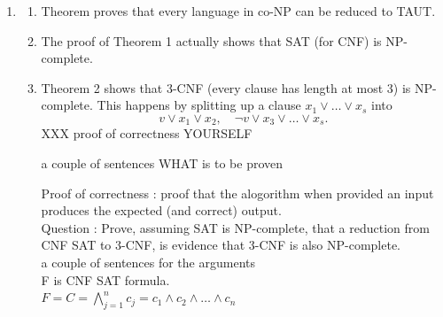 \documentclass[a4paper]{report}
\begin{document}
\begin{enumerate}
\item \cite{Cook1971NP}
  \begin{enumerate}
  \item Theorem proves that every language in co-NP can be reduced to TAUT.
  \item The proof of Theorem 1 actually shows that SAT (for CNF) is NP-complete.
  \item Theorem 2 shows that 3-CNF (every clause has length at most 3) is NP-complete. This happens by splitting up a clause $x_1 \vee \dots \vee x_s$ into
    \begin{displaymath}
      v \vee x_1 \vee x_2, \quad \neg v \vee x_3 \vee \dots \vee x_s.
    \end{displaymath}
XXX proof of correctness YOURSELF

a couple of sentences WHAT is to be proven

Proof of correctness : proof that the alogorithm when provided an input produces the expected (and correct) output.\\

Question : Prove, assuming SAT is NP-complete, that a reduction from CNF SAT to 3-CNF, is evidence that 3-CNF is also NP-complete.\\

a couple of sentences for the arguments
\\
F is CNF SAT formula.\\ 
$F =  C = \bigwedge_{j=1}^{n} c_j = c_1 \wedge c_2 \wedge \dots \wedge c_n$


\end{enumerate}
\end{enumerate}
\end{document}
